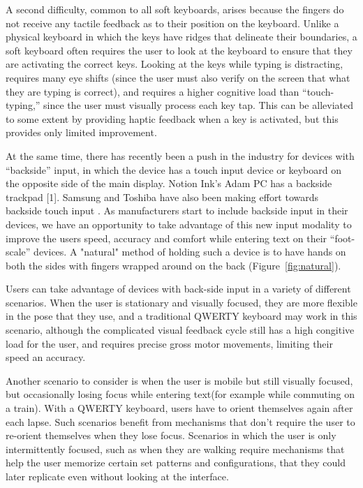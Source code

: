 A second difficulty, common to all soft keyboards, arises because the
fingers do not receive any tactile feedback as to their position on
the keyboard.  Unlike a physical keyboard in which the keys have
ridges that delineate their boundaries, a soft keyboard often requires
the user to look at the keyboard to ensure that they are activating
the correct keys.  Looking at the keys while typing is distracting,
requires many eye shifts (since the user must also verify on the
screen that what they are typing is correct), and requires a higher
cognitive load than ``touch-typing,'' since the user must visually
process each key tap.  This can be alleviated to some extent by
providing haptic feedback when a key is activated, but this provides
only limited improvement.

At the same time, there has recently been a push in the industry for
devices with ``backside'' input, in which the device has a touch input
device or keyboard on the opposite side of the main display. Notion
Ink's Adam PC has a backside trackpad [1]. Samsung and Toshiba have
also been making effort towards backside touch input
. As manufacturers start to include backside input in their devices, we have an opportunity to take advantage of this new input modality to improve the users speed, accuracy and comfort while entering text on their ``foot-scale'' devices.  A "natural" method of holding such a device is to have
hands on both the sides with fingers wrapped around on the back
(Figure~\ref{fig:natural}). 

Users can take advantage of devices with back-side input in a variety
of different scenarios. When the user is stationary and visually
focused, they are more flexible in the pose that they use, and a
traditional QWERTY keyboard may work in this scenario, although the
complicated visual feedback cycle still has a high congitive load for
the user, and requires precise gross motor movements, limiting their speed an accuracy. 

Another scenario to consider is when the user is mobile but still
visually focused, but occasionally losing focus while entering
text(for example while commuting on a train).  With a QWERTY keyboard,
users have to orient themselves again after each lapse. Such scenarios
benefit from mechanisms that don't require the user to re-orient
themselves when they lose focus.  Scenarios in which the user is only
intermittently focused, such as when they are walking require
mechanisms that help the user memorize certain set patterns and
configurations, that they could later replicate even without looking
at the interface. 

